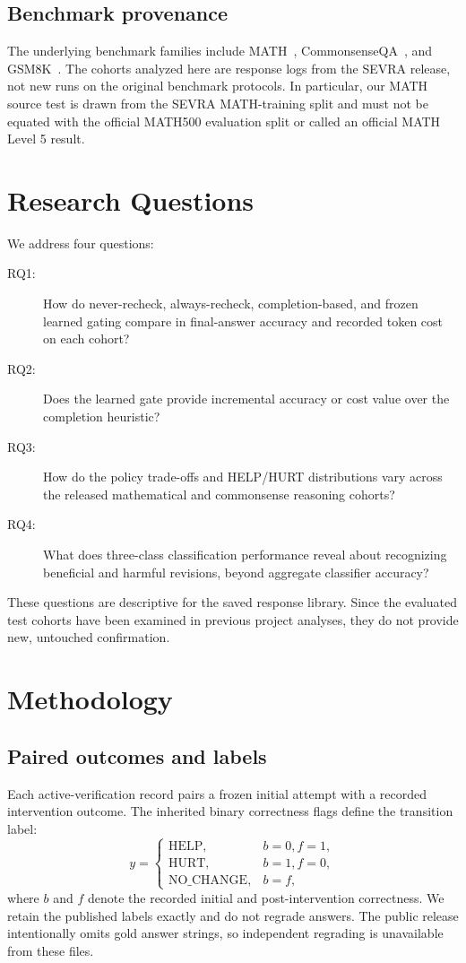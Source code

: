 \documentclass[conference]{IEEEtran}
\begin{document}
\subsection{Benchmark provenance}
The underlying benchmark families include MATH~\cite{hendrycks2021math}, CommonsenseQA~\cite{talmor2019commonsenseqa}, and GSM8K~\cite{cobbe2021gsm8k}. The cohorts analyzed here are response logs from the SEVRA release, not new runs on the original benchmark protocols. In particular, our MATH source test is drawn from the SEVRA MATH-training split and must not be equated with the official MATH500 evaluation split or called an official MATH Level 5 result.

\section{Research Questions}
We address four questions:
\begin{description}
  \item[RQ1:] How do never-recheck, always-recheck, completion-based, and frozen learned gating compare in final-answer accuracy and recorded token cost on each cohort?
  \item[RQ2:] Does the learned gate provide incremental accuracy or cost value over the completion heuristic?
  \item[RQ3:] How do the policy trade-offs and HELP/HURT distributions vary across the released mathematical and commonsense reasoning cohorts?
  \item[RQ4:] What does three-class classification performance reveal about recognizing beneficial and harmful revisions, beyond aggregate classifier accuracy?
\end{description}

These questions are descriptive for the saved response library. Since the evaluated test cohorts have been examined in previous project analyses, they do not provide new, untouched confirmation.

\section{Methodology}
\subsection{Paired outcomes and labels}
Each active-verification record pairs a frozen initial attempt with a recorded intervention outcome. The inherited binary correctness flags define the transition label:
\begin{equation}
 y = \begin{cases}
 \mathrm{HELP}, & b=0, f=1,\\
 \mathrm{HURT}, & b=1, f=0,\\
 \mathrm{NO\_CHANGE}, & b=f,
 \end{cases}
\end{equation}
where $b$ and $f$ denote the recorded initial and post-intervention correctness. We retain the published labels exactly and do not regrade answers. The public release intentionally omits gold answer strings, so independent regrading is unavailable from these files.
\end{document}
